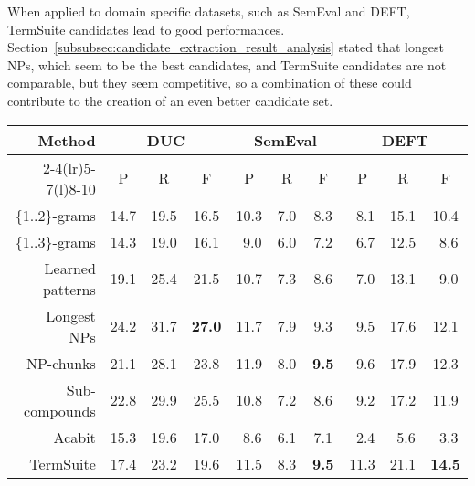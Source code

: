       When applied to domain specific datasets, such as SemEval and DEFT,
      TermSuite candidates  lead to good performances.
      Section~\ref{subsubsec:candidate_extraction_result_analysis} stated that
      longest NPs, which seem to be the best candidates, and TermSuite
      candidates are not comparable, but they seem competitive, so a combination
      of these could contribute to the creation of an even better candidate set.

      \begin{table*}
        \centering
        \begin{tabular}{rccccccccc}
          \toprule
          \multirow{2}{*}[-2pt]{\textbf{Method}} & \multicolumn{3}{c}{\textbf{DUC}} & \multicolumn{3}{c}{\textbf{SemEval}} & \multicolumn{3}{c}{\textbf{DEFT}}\\
          \cmidrule(r){2-4}\cmidrule(lr){5-7}\cmidrule(l){8-10}
          & P & R & F & P & R & F & P & R & F\\
          \midrule
          \{1..2\}-grams & 14.7 & 19.5 & 16.5 & 10.3 & $~~$7.0 & $~~$8.3 & $~~$8.1 & 15.1 & 10.4\\
          \{1..3\}-grams & 14.3 & 19.0 & 16.1 & $~~$9.0 & $~~$6.0 & $~~$7.2 & $~~$6.7 & 12.5 & $~~$8.6\\
          Learned patterns & 19.1 & 25.4 & 21.5 & 10.7 & $~~$7.3 & $~~$8.6 & $~~$7.0 & 13.1 & $~~$9.0\\
          Longest NPs & 24.2 & 31.7 & \textbf{27.0} & 11.7 & $~~$7.9 & $~~$9.3 & $~~$9.5 & 17.6 & 12.1\\
          NP-chunks & 21.1 & 28.1 & 23.8 & 11.9 & $~~$8.0 & \textbf{$~~$9.5} & $~~$9.6 & 17.9 & 12.3\\
          Sub-compounds & 22.8 & 29.9 & 25.5 & 10.8 & $~~$7.2 & $~~$8.6 & $~~$9.2 & 17.2 & 11.9\\
          Acabit & 15.3 & 19.6 & 17.0 & $~~$8.6 & $~~$6.1 & $~~$7.1 & $~~$2.4 & $~~$5.6 & $~~$3.3\\
          TermSuite & 17.4 & 23.2 & 19.6 & 11.5 & $~~$8.3 & \textbf{$~~$9.5} & 11.3 & 21.1 & \textbf{14.5}\\
          \bottomrule
        \end{tabular}
        \caption{Comparison of candidate extraction methods, when extracting 10
                 keyphrases with \textbf{TF-IDF}. Results are expressed as a
                 percentage of precision (P), recall (R) and f-score (F).
                 \label{tab:tfidf_results}}
      \end{table*}
